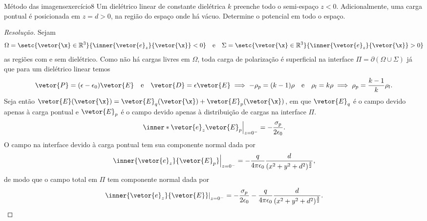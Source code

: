 \begin{exercício}{Método das imagens}{exercício8}
    Um dielétrico linear de constante dielétrica \(k\) preenche todo o semi-espaço \(z < 0\). Adicionalmente, uma carga pontual é posicionada em \(z = d > 0\), na região do espaço onde há vácuo. Determine o potencial em todo o espaço.
\end{exercício}
\begin{proof}[Resolução]
    Sejam
    \begin{equation*}
        \Omega = \setc{\vetor{\x}\in \mathbb{R}^3}{\inner{\vetor{e}_z}{\vetor{\x}} < 0}
        \quad\text{e}\quad
        \Sigma = \setc{\vetor{\x}\in \mathbb{R}^3}{\inner{\vetor{e}_z}{\vetor{\x}} > 0}
    \end{equation*}
    as regiões com e sem dielétrico. Como não há cargas livres em \(\Omega\), toda carga de polarização é superficial na interface \(\Pi = \partial (\Omega \cup \Sigma)\) já que para um dielétrico linear temos
    \begin{equation*}
        \vetor{P} = (\epsilon - \epsilon_0)\vetor{E}\quad\text{e}\quad\vetor{D} = \epsilon \vetor{E} \implies -\rho_p = (k - 1)\rho\quad\text{e}\quad\rho_l = k \rho \implies \rho_p = \frac{k - 1}{k} \rho_l.
    \end{equation*}
    Seja então \(\vetor{E}(\vetor{\x}) = \vetor{E}_q(\vetor{\x}) + \vetor{E}_p(\vetor{\x})\), em que \(\vetor{E}_q\) é o campo devido apenas à carga pontual e \(\vetor{E}_p\) é o campo devido apenas à distribuição de cargas na interface \(\Pi\). 
    \begin{equation*}
        \left.\inner*{\vetor{e}_z}{\vetor{E}_p}\right|_{z = 0^-} = -\frac{\sigma_p}{2 \epsilon_0}.
    \end{equation*}
    O campo na interface devido à carga pontual tem sua componente normal dada por
    \begin{equation*}
        \left.\inner{\vetor{e}_z}{\vetor{E}_p}\right|_{z = 0^-} =-\frac{q}{4\pi \epsilon_0} \frac{d}{(x^2 + y^2 + d^2)^{\frac32}},
    \end{equation*}
    de modo que o campo total em \(\Pi\) tem componente normal dada por
    \begin{equation*}
        \left.\inner{\vetor{e}_z}{\vetor{E}}\right|_{z = 0^{-}} =-\frac{\sigma_p}{2 \epsilon_0} - \frac{q}{4\pi \epsilon_0} \frac{d}{(x^2 + y^2 + d^2)^{\frac32}}.
    \end{equation*}

\end{proof}
